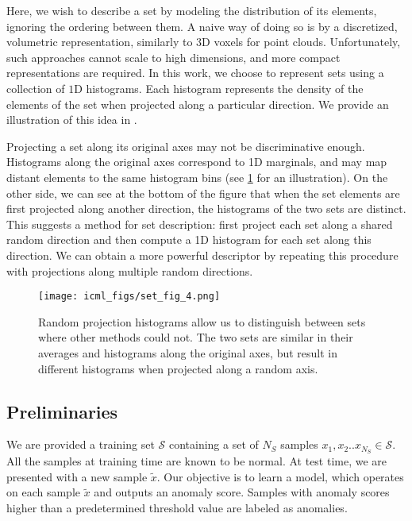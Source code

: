 \documentclass{article}
\begin{document}
Here, we wish to describe a set by modeling the distribution of its elements, ignoring the ordering between them. A naive way of doing so is by a discretized, volumetric representation, similarly to $3$D voxels for point clouds. Unfortunately, such approaches cannot scale to high dimensions, and more compact representations are required. In this work, we choose to represent sets using a collection of $1$D histograms. Each histogram represents the density of the elements of the set when projected along a particular direction. We provide an illustration of this idea in . 


Projecting a set along its original axes may not be discriminative enough. Histograms along the original axes correspond to 1D marginals, and may map distant elements to the same histogram bins (see \ref{fig:set_hists} for an illustration). On the other side, we can see at the bottom of the figure that when the set elements are first projected along another direction, the histograms of the two sets are distinct. This suggests a method for set description: first project each set along a shared random direction and then compute a 1D histogram for each set along this direction. We can obtain a more powerful descriptor by repeating this procedure with projections along multiple random directions. 


\begin{figure}
  \centering
  \texttt{[image: icml\_figs/set\_fig\_4.png]}

  \caption{ Random projection histograms allow us to distinguish between sets where other methods could not. The two sets are similar in their averages and histograms along the original axes, but result in different histograms when projected along a random axis. }
  \label{fig:set_hists}
  \vspace{5pt}
\end{figure}


\subsection{Preliminaries}
\label{subsec:prelim}


We are provided a training set $\mathcal{S}$ containing a set of $N_S$ samples $x_1,x_2..x_{N_S} \in \mathcal{S}$. All the samples at training time are known to be normal. At test time, we are presented with a new sample $\tilde{x}$. Our objective is to learn a model, which operates on each sample $\tilde{x}$ and outputs an anomaly score. Samples with anomaly scores higher than a predetermined threshold value are labeled as anomalies.
\end{document}
